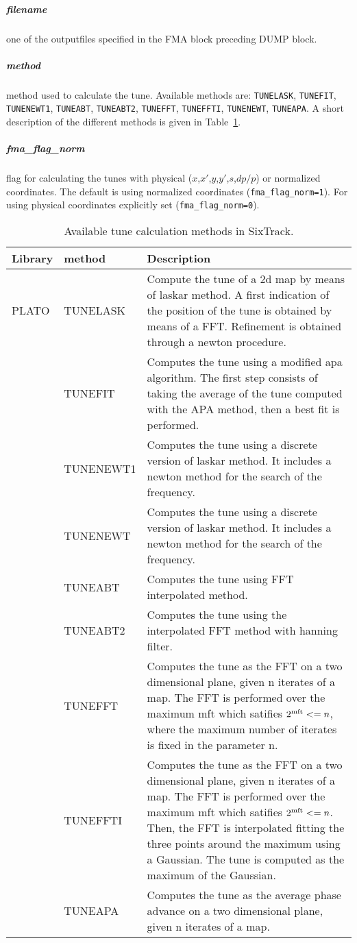 \documentclass[a4paper,11pt]{report}
\begin{document}
\subparagraph{filename}
one of the outputfiles specified in the FMA block preceding DUMP block.
\subparagraph{method}
method used to calculate the tune. Available methods are: \verb|TUNELASK|, \verb|TUNEFIT|, \verb|TUNENEWT1|, \verb|TUNEABT|, \verb|TUNEABT2|, \verb|TUNEFFT|, \verb|TUNEFFTI|, \verb|TUNENEWT|, \verb|TUNEAPA|. A short description of the different methods is given in Table~\ref{fma:tab:1}.
\subparagraph{fma\_flag\_norm}
flag for calculating the tunes with physical ($x$,$x'$,$y$,$y'$,$s$,$dp/p$) or normalized coordinates. The default is using normalized coordinates (\verb|fma_flag_norm=1|). For using physical coordinates explicitly set (\verb|fma_flag_norm=0|).

\begin{table}[H]
	\begin{center}
		\caption{Available tune calculation methods in SixTrack.}
		\label{fma:tab:1}
		\begin{tabularx}{\textwidth}{|l|l|X|}
			\hline
\textbf{Library} & \textbf{method} & \textbf{Description} \\\hline
PLATO \cite{plato1,plato2}
& TUNELASK &	Compute the tune of a 2d map by means of laskar method. A first indication of the position of the tune is obtained by means of a FFT. Refinement is obtained through a newton procedure.\\\cline{2-3}
& TUNEFIT &	Computes the tune using a modified apa algorithm. The first step consists of taking the average of the tune computed with the APA method, then a best fit is performed.\\\cline{2-3}
& TUNENEWT1 &	Computes the tune using a discrete version of laskar method. It includes a newton method for the search of the frequency.\\\cline{2-3}
& TUNENEWT &	Computes the tune using a discrete version of laskar method. It includes a newton method for the search of the frequency.\\\cline{2-3}
& TUNEABT &	Computes the tune using FFT interpolated method.\\\cline{2-3}
& TUNEABT2 &	Computes the tune using the interpolated FFT method with hanning filter.\\\cline{2-3}
& TUNEFFT &	Computes the tune as the FFT on a two dimensional plane, given n iterates of a map. The FFT is performed over the maximum mft which satifies $2^{\rm mft} <= n$, where the maximum number of iterates is fixed in the parameter n.\\\cline{2-3}
& TUNEFFTI &	Computes the tune as the FFT on a two dimensional plane, given n iterates of a map. The FFT is performed over the maximum mft which satifies $2^{\rm mft} <= n$. Then, the FFT is interpolated fitting the three points around the maximum using a Gaussian. The tune is computed as the maximum of the Gaussian.\\\cline{2-3}
& TUNEAPA &	Computes the tune as the average phase advance on a two dimensional plane, given n iterates of a map. \\\hline
	\end{tabularx}
\end{center}
\end{table}
\end{document}
